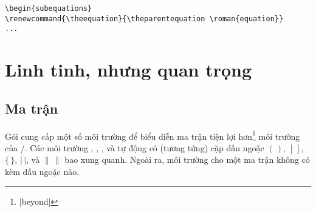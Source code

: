 \documentclass[11pt,leqno,titlepage,openany,oneside]{amsldoc}[1999/12/13]
\begin{document}
\medskip
\begin{verbatim}
\begin{subequations}
\renewcommand{\theequation}{\theparentequation \roman{equation}}
...
\end{verbatim}


\chapter{Linh tinh, nhưng quan trọng}

\section{Ma trận}\label{ss:matrix}

Gói  cung cấp một số môi trường để biểu diễn ma trận
tiện lợi hơn\footnote{|beyond|} môi trường  của \latex/.
Các môi trường , , , 
và  tự động có (tương tứng) cặp dấu ngoặc $(\,)$, $[\,]$,
$\lbrace\,\rbrace$,
$\lvert\,\rvert$, và $\lVert\,\rVert$ bao xung quanh.
Ngoài ra, môi trường  cho một ma trận không có kèm dấu ngoặc nào.
\end{document}
